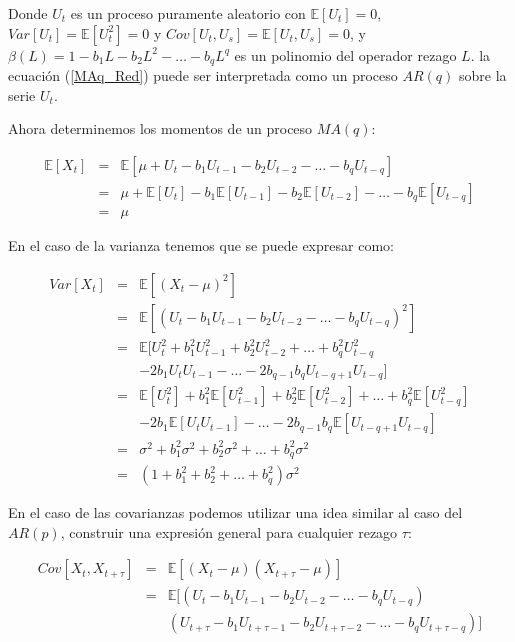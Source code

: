 \documentclass[
  a4paper,
]{article}
\begin{document}
Donde \(U_t\) es un proceso puramente aleatorio con
\(\mathbb{E}[U_t] = 0\), \(Var[U_t] = \mathbb{E}[U_t^2] = 0\) y
\(Cov[U_t, U_s] = \mathbb{E}[U_t, U_s] = 0\), y
\(\beta(L) = 1 - b_1 L - b_2 L^2 - \ldots - b_q L^q\) es un polinomio
del operador rezago \(L\). la ecuación (\ref{MAq_Red}) puede ser
interpretada como un proceso \(AR(q)\) sobre la serie \(U_t\).

Ahora determinemos los momentos de un proceso \(MA(q)\):

\begin{eqnarray}
    \mathbb{E}[X_t] & = & \mathbb{E}[\mu + U_t - b_1 U_{t-1} - b_2 U_{t-2} - \ldots - b_q U_{t-q}] \nonumber \\
    & = & \mu + \mathbb{E}[U_t] - b_1 \mathbb{E}[U_{t-1}] - b_2 \mathbb{E}[U_{t-2}] - \ldots - b_q \mathbb{E}[U_{t-q}] \nonumber \\
    & = & \mu
\end{eqnarray}

En el caso de la varianza tenemos que se puede expresar como:

\begin{eqnarray}
    Var[X_t] & = & \mathbb{E}[(X_t - \mu)^2] \nonumber \\
    & = & \mathbb{E}[(U_t - b_1 U_{t-1} - b_2 U_{t-2} - \ldots - b_q U_{t-q})^2] \nonumber \\
    & = & \mathbb{E}[U_t^2 + b_1^2 U_{t-1}^2 + b_2^2 U_{t-2}^2 + \ldots + b_q^2 U_{t-q}^2 \nonumber \\
    &   & - 2 b_1 U_t U_{t - 1} - \ldots - 2 b_{q - 1} b_q U_{t - q + 1} U_{t - q}] \nonumber \\
    & = & \mathbb{E}[U_t^2] + b_1^2 \mathbb{E}[U_{t-1}^2] + b_2^2 \mathbb{E}[U_{t-2}^2] + \ldots + b_q^2 \mathbb{E}[U_{t-q}^2] \nonumber \\
    &   & - 2 b_1 \mathbb{E}[U_t U_{t - 1}] - \ldots - 2 b_{q - 1} b_q \mathbb{E}[U_{t - q + 1} U_{t - q}] \nonumber \\
    & = & \sigma^2 + b^2_1 \sigma^2 + b^2_2 \sigma^2 + \ldots + b^2_q \sigma^2 \nonumber \\
    & = & (1 + b^2_1 + b^2_2 + \ldots + b^2_q) \sigma^2
\end{eqnarray}

En el caso de las covarianzas podemos utilizar una idea similar al caso
del \(AR(p)\), construir una expresión general para cualquier rezago
\(\tau\):

\begin{eqnarray}
    Cov[X_t, X_{t + \tau}] & = & \mathbb{E}[(X_t - \mu)(X_{t + \tau} - \mu)] \nonumber \\
    & = & \mathbb{E}[(U_t - b_1 U_{t-1} - b_2 U_{t-2} - \ldots - b_q U_{t-q}) \nonumber \\
    &   & (U_{t + \tau} - b_1 U_{t + \tau -1} - b_2 U_{t + \tau -2} - \ldots - b_q U_{t + \tau - q})] \nonumber
\end{eqnarray}
\end{document}
